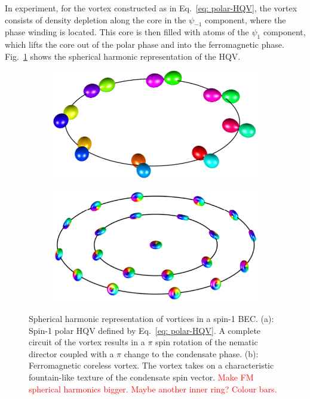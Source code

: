 In experiment, for the vortex constructed as in Eq.~\eqref{eq: polar-HQV}, the
vortex consists of density depletion along the core in the \(\psi_{-1}\)
component, where the phase winding is located.
This core is then filled with atoms of the \(\psi_1 \) component, which lifts
the core out of the polar phase and into the ferromagnetic phase.
Fig.~\ref{subfig: polar-HQV} shows the spherical harmonic representation of the
HQV.\@
\begin{figure}
    \centering
    \begin{subfigure}{0.49\textwidth}
        \includegraphics[width=\textwidth]
        {gfx/ch-groundStateSymmetries/polar-HQV.pdf}
        \caption{\label{subfig: polar-HQV}}
    \end{subfigure}
    \begin{subfigure}{0.49\textwidth}
        \includegraphics[width=\textwidth]
        {gfx/ch-groundStateSymmetries/coreless.pdf}
        \caption{\label{subfig: coreless-vortex}}
    \end{subfigure}
    \caption[Spherical harmonic representation of spin-1 vortices]
    {Spherical harmonic representation of vortices in a spin-1 BEC.\@
        (a): Spin-1 polar HQV defined by Eq.~\eqref{eq: polar-HQV}.
        A complete circuit of the vortex results in a \(\pi \) spin rotation of
        the nematic director coupled with a \(\pi \) change to the condensate
        phase.
        (b): Ferromagnetic coreless vortex.
        The vortex takes on a characteristic fountain-like texture of the
        condensate spin vector. \textcolor{red}{Make FM spherical harmonics
            bigger. Maybe another inner ring? Colour bars.}
    }
\end{figure}

